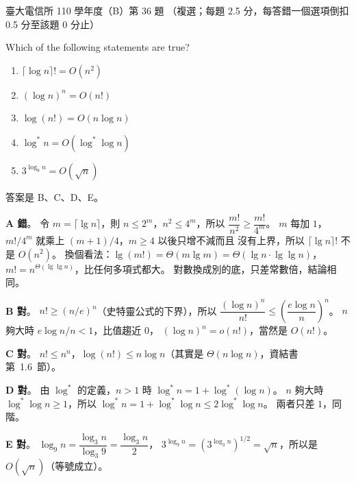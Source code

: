 \begin{pastexam}[label={px:ntu-110-comm-dsa-36}]{臺大電信所 110 學年度（B）第 36 題}
（複選；每題 2.5 分，每答錯一個選項倒扣 0.5 分至該題 0 分止）

Which of the following statements are true?
\begin{enumerate}[label=\Alph*.]
\item $\lceil\log n\rceil!=O(n^2)$
\item $(\log n)^n=O(n!)$
\item $\log(n!)=O(n\log n)$
\item $\log^* n=O(\log^*\log n)$
\item $3^{\log_9 n}=O(\sqrt{n})$
\end{enumerate}
\end{pastexam}

\begin{pastsoln}
答案是 B、C、D、E。

\textbf{A 錯}。 令 $m = \lceil\lg n\rceil$，則 $n \le 2^m$，$n^2 \le 4^m$，所以
$\dfrac{m!}{n^2} \ge \dfrac{m!}{4^m}$。 $m$ 每加 $1$，$m!/4^m$ 就乘上 $(m + 1)/4$，$m \ge 4$ 以後只增不減而且
沒有上界，所以 $\lceil\lg n\rceil!$ 不是 $O(n^2)$。 換個看法：$\lg(m!) = \Theta(m\lg m) = \Theta(\lg n\cdot\lg\lg n)$，
$m! = n^{\Theta(\lg\lg n)}$，比任何多項式都大。 對數換成別的底，只差常數倍，結論相同。

\textbf{B 對}。 $n! \ge (n/e)^n$（史特靈公式的下界），所以
$\dfrac{(\log n)^n}{n!} \le \left(\dfrac{e\log n}{n}\right)^n$。 $n$ 夠大時 $e\log n / n < 1$，比值趨近 $0$，
$(\log n)^n = o(n!)$，當然是 $O(n!)$。

\textbf{C 對}。 $n! \le n^n$，$\log(n!) \le n\log n$（其實是 $\Theta(n\log n)$，資結書第~1.6~節）。

\textbf{D 對}。 由 $\log^*$ 的定義，$n > 1$ 時 $\log^* n = 1 + \log^*(\log n)$。 $n$ 夠大時
$\log^*\log n \ge 1$，所以 $\log^* n = 1 + \log^*\log n \le 2\log^*\log n$。 兩者只差 $1$，同階。

\textbf{E 對}。 $\log_9 n = \dfrac{\log_3 n}{\log_3 9} = \dfrac{\log_3 n}{2}$，
$3^{\log_9 n} = \left(3^{\log_3 n}\right)^{1/2} = \sqrt n$，所以是 $O(\sqrt n)$（等號成立）。
\end{pastsoln}
